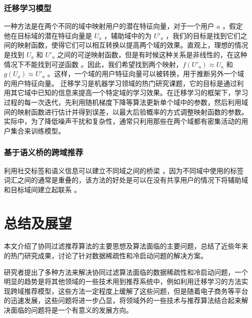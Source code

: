 \subsection{迁移学习模型} %
\label{sub:迁移学习模型}
一种方法是在两个不同的域中映射用户的潜在特征向量，对于一个用户 $a$ ，假定他在目标域的潜在特征向量是 $U_a$ ，辅助域中的为 $U'_a$ ，我们的目标是找到它们之间的映射函数，使得它们可以相互转换以提高两个域的效果。直观上，理想的情况是找到 $U_a$ 和 $U'_a$ 之间的可逆映射函数，但是有时候这种关系是非线性的，在这种情况下不能找到可逆函数 \cite{Xin2015Cross}。因此，我们希望找到两个映射，$f(U'_a) \approx U_a$ 和 $g(U_a) \approx U'_a$ 。这样，一个域的用户特征向量可以被转换，用于推断另外一个域的用户特征向量。
迁移学习是机器学习领域的热门研究课题，它的目标是通过利用其它域中已知的信息来提高一个特定域的学习效果。在迁移学习的框架下，学习过程的每一次迭代，先利用随机梯度下降等算法更新单个域中的参数，然后利用域间的映射函数进行估计并得到误差，以最大后验概率的方式调整映射函数的参数。实际中，为了降低噪声干扰和复杂性，通常只利用那些在两个域都有密集活动的用户集合来训练模型。

\subsection{基于语义桥的跨域推荐} %
\label{sub:基于语义桥的跨域推荐}
利用社交标签和语义信息可以建立不同域之间的桥梁 \cite{Enrich2013Cold,chen2016capturing}，因为不同域中使用的标签词汇之间的通常是重叠的\cite{项亮2012推荐系统实践}，该方法的好处是可以在没有共享用户的情况下将辅助域和目标域间建立起联系 \cite{shi2011tags}。




\chapter{总结及展望} %
\label{sec:总结及展望}
本文介绍了协同过滤推荐算法的主要思想及算法面临的主要问题，总结了近些年来的热门研究成果，讨论了针对数据稀疏性和冷启动问题的解决方案。

研究者提出了多种方法来解决协同过滤算法面临的数据稀疏性和冷启动问题，一个明显的趋势是将其他领域的一些技术用到推荐系统中，例如利用迁移学习的方法实现跨域推荐模型，这些方法一定程度上缓解了这些问题，但是随着电子商务等平台的迅速发展，这些问题将进一步凸显，将领域外的一些技术与推荐算法结合起来解决面临的问题将是一个有意义的发展方向。








